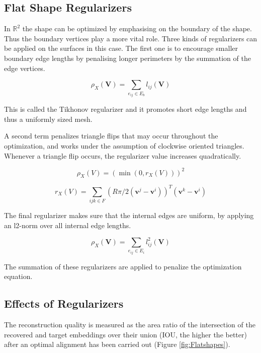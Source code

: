 \documentclass[a4paper,10pt]{article}
\begin{document}
\subsection{Flat Shape Regularizers}

In $ \mathbb{R}^2 $ the shape can be optimized by emphasising on the boundary of the shape. Thus the boundary vertices play a more vital role. Three kinds of regularizers can be applied on the surfaces in this case. The first one is to encourage smaller boundary edge lengths by penalising longer perimeters by the summation of the edge vertices. 


    \begin{equation}
           \rho_{X}(\mathbf{V}) = \sum_{e_{ij} \in E_{b}} l_{ij}(\mathbf{V}) 
    \end{equation}  
 
This is called the Tikhonov regularizer and it promotes short
edge lengths and thus a uniformly sized mesh.

A second term penalizes triangle flips that may
occur throughout the optimization, and works under the assumption of clockwise oriented triangles. Whenever a triangle flip occurs, the regularizer value increases quadratically. 
  
    \begin{equation}
    \rho_{X}(V)=\left(\min \left(0, r_{X}(V)\right)\right)^{2}
    \end{equation}
   
   \begin{equation}
   r_{X}(V)=\sum_{i j k \in F}\left(R \pi / 2 \left(\mathbf{v}^{j}-\mathbf{v}^{i}\right)\right)^{T}\left(\mathbf{v}^{k}-\mathbf{v}^{i}\right)
   \end{equation}
  
The final regularizer makes sure that the internal edges are uniform, by applying an l2-norm over all internal edge lengths.

    \begin{equation}
     \rho_{X}(\mathbf{V}) = \sum_{e_{ij} \in E_{i}} l_{ij}^2(\mathbf{V})
    \end{equation}

The summation of these regularizers are applied to penalize the optimization equation.


\subsection{Effects of Regularizers}


The reconstruction quality is measured as
the area ratio of the intersection of the recovered and target embeddings over their union (IOU, the higher the better) after an optimal alignment has been carried out (Figure \ref{fig:Flatshapes}).
\end{document}
